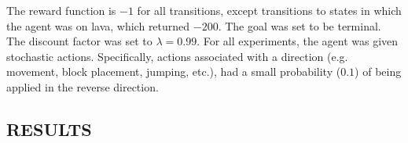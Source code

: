 \documentclass[]{article}
\begin{document}
The reward function is $-1$ for all transitions, except
transitions to states in which the agent was on lava, which returned 
$-200$. The goal was set to be terminal. The discount
factor was set to $\lambda = 0.99$. For all experiments, the agent was given stochastic actions. Specifically, actions associated with a direction (e.g. movement, block placement, jumping, etc.), had a small probability ($0.1$) of being applied in the reverse direction.




\subsection{RESULTS}


%
%
\end{document}
